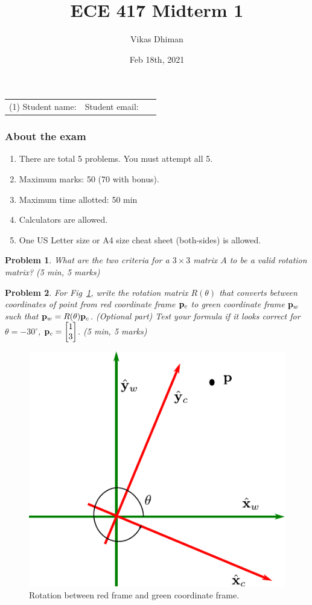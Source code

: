 \documentclass{article}
\title{ECE 417 Midterm 1}
\date{Feb 18th, 2021}
\author{Vikas Dhiman}
\newtheorem{prob}{Problem}
\begin{document}
\maketitle

\begin{tabular}{p{0.5\linewidth}p{0.5\linewidth}}
  (1) Student name:& Student email: \\
\end{tabular}

\subsubsection*{About the exam}
\begin{enumerate}
  \item There are total 5 problems. You must attempt all 5. 
  \item Maximum marks: 50 (70 with bonus).
  \item Maximum time allotted:  50 min
  \item Calculators are allowed.
  \item One US Letter size or A4 size cheat sheet (both-sides) is allowed.
\end{enumerate}

\begin{prob}
  What are the two criteria for a $3 \times 3$ matrix $A$ to be a valid rotation matrix?
  (5 min, 5 marks)
\end{prob}
\newpage

\begin{prob}
  For Fig~\ref{fig:rot-2D}, write the rotation matrix $R(\theta)$ that converts
  between coordinates of point from red coordinate frame $\mathbf{p}_c$ to green
  coordinate frame $\mathbf{p}_w$ such that $\mathbf{p}_w = R(\theta) \mathbf{p}_c$. (Optional
  part) Test your
  formula if it looks correct for $\theta  = -30^\circ$, $\mathbf{p}_c
  = \begin{bmatrix} 1 \\ 3 \end{bmatrix}$.
  (5 min, 5 marks)
\end{prob}

\begin{figure}
  \centering
  \includegraphics[width=0.5\linewidth]{media/rot-2D.pdf}
  \caption{Rotation between red frame and green coordinate frame.}
  \label{fig:rot-2D}
\end{figure}
\end{document}
